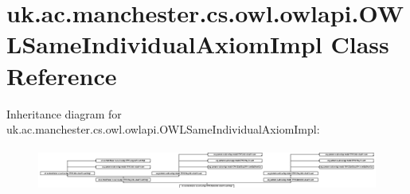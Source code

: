 \hypertarget{classuk_1_1ac_1_1manchester_1_1cs_1_1owl_1_1owlapi_1_1_o_w_l_same_individual_axiom_impl}{\section{uk.\-ac.\-manchester.\-cs.\-owl.\-owlapi.\-O\-W\-L\-Same\-Individual\-Axiom\-Impl Class Reference}
\label{classuk_1_1ac_1_1manchester_1_1cs_1_1owl_1_1owlapi_1_1_o_w_l_same_individual_axiom_impl}
}
Inheritance diagram for uk.\-ac.\-manchester.\-cs.\-owl.\-owlapi.\-O\-W\-L\-Same\-Individual\-Axiom\-Impl\-:\begin{figure}[H]
\begin{center}
\leavevmode
\includegraphics[height=1.428571cm]{classuk_1_1ac_1_1manchester_1_1cs_1_1owl_1_1owlapi_1_1_o_w_l_same_individual_axiom_impl}
\end{center}
\end{figure}
